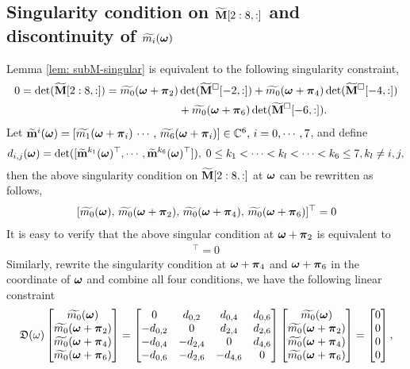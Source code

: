 \subsection{Singularity condition on $\widetilde{\mathbf{M}}[2:8,:]$ and discontinuity of $\widetilde{m_{i}}(\boldsymbol{\omega})$}
Lemma \ref{lem: subM-singular} is equivalent to the following singularity constraint,
\begin{align}
0=\det(\widetilde{\mathbf{M}}[2:8,:]) = \widetilde{m_0}(\boldsymbol{\omega}+\boldsymbol{\pi}_2)&\det(\widetilde{\mathbf{M}}^{\Box}[-2,:])
+ \widetilde{m_0}(\boldsymbol{\omega}+\boldsymbol{\pi}_4)\det(\widetilde{\mathbf{M}}^{\Box}[-4,:])\notag\\
&+ \widetilde{m_0}(\boldsymbol{\omega}+\boldsymbol{\pi}_6)\det(\widetilde{\mathbf{M}}^{\Box}[-6,:]). \notag
\end{align}
Let $\widetilde{\mathbf{m}}^{i}(\boldsymbol{\omega}) = [\widetilde{m_1}(\boldsymbol{\omega}+\boldsymbol{\pi}_i)\, \cdots,\,\widetilde{m_6}(\boldsymbol{\omega}+\boldsymbol{\pi}_i)]\in\mathbb{C}^6,\, i = 0,\cdots,7$, and define $$d_{i,j}(\boldsymbol{\omega}) = \det([\widetilde{\mathbf{m}}^{k_1}(\boldsymbol{\omega})^\top,\cdots,\widetilde{\mathbf{m}}^{k_6}(\boldsymbol{\omega})^\top]),\; 0\leq k_1 < \cdots<k_l<\cdots<k_6\leq 7, k_l\neq i,j,$$
then the above singularity condition on $\widetilde{\mathbf{M}}[2:8,:]$ at $\boldsymbol{\omega}$ can be rewritten as follows,
\begin{align*}
[0,\, d_{0,2}(\V{\omega}),\, d_{0,4}(\V{\omega}),\, d_{0,6}(\V{\omega})]\,[\widetilde{m_0}(\V{\omega}),\,\widetilde{m_0}(\V{\omega}+\V{\pi}_2),\, \widetilde{m_0}(\V{\omega}+\V{\pi}_4),\,\widetilde{m_0}(\V{\omega}+\V{\pi}_6)]^\top = 0
\end{align*}
It is easy to verify that the above singular condition at $\boldsymbol{\omega}+\boldsymbol{\pi}_2$ is equivalent to 
\begin{align*}
[-d_{0,2}(\V{\omega}),\, 0,\,d_{2,4}(\V{\omega}),\,d_{2,6}][\widetilde{m_0}(\V{\omega}),\,\widetilde{m_0}(\V{\omega}+\V{\pi}_2),\, \widetilde{m_0}(\V{\omega}+\V{\pi}_4),\,\widetilde{m_0}(\V{\omega}+\V{\pi}_6)]^\top = 0
\end{align*}
Similarly, rewrite the singularity condition at $\boldsymbol{\omega}+\boldsymbol{\pi}_4$ and $\boldsymbol{\omega}+\boldsymbol{\pi}_6$ in the coordinate of $\boldsymbol{\omega}$ and combine all four conditions, we have the following linear constraint
\begin{align}
\label{eq: singular-cond}
\mathfrak{D}(\omega)\begin{bmatrix}
\widetilde{m_{0}}(\boldsymbol{\omega})\\
\widetilde{m_{0}}(\boldsymbol{\omega}+\boldsymbol{\pi}_{2})\\
\widetilde{m_{0}}(\boldsymbol{\omega}+\boldsymbol{\pi}_{4})\\
\widetilde{m_{0}}(\boldsymbol{\omega}+\boldsymbol{\pi}_{6})
\end{bmatrix}
=
\begin{bmatrix}
0 & d_{0,2} & d_{0,4} & d_{0,6}\\
-d_{0,2} & 0 & d_{2,4} & d_{2,6}\\
-d_{0,4} & -d_{2,4} & 0 & d_{4,6}\\
-d_{0,6} & -d_{2,6} & -d_{4,6} & 0
\end{bmatrix}
\begin{bmatrix}
\widetilde{m_{0}}(\boldsymbol{\omega})\\
\widetilde{m_{0}}(\boldsymbol{\omega}+\boldsymbol{\pi}_{2})\\
\widetilde{m_{0}}(\boldsymbol{\omega}+\boldsymbol{\pi}_{4})\\
\widetilde{m_{0}}(\boldsymbol{\omega}+\boldsymbol{\pi}_{6})
\end{bmatrix}
= \begin{bmatrix}
0\\0\\0\\0
\end{bmatrix},
\end{align}
